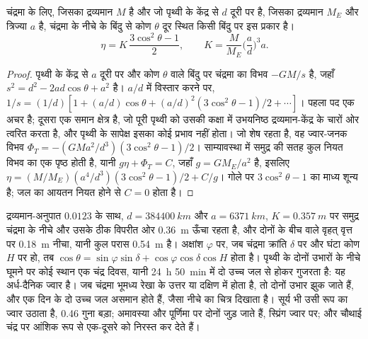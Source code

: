 \begin{theorem}[चंद्रमा का साम्य ज्वार]\label{thm:b3:ocean-dynamics:equilibrium-tide}
चंद्रमा के लिए, जिसका द्रव्यमान $M$ है और जो पृथ्वी के केंद्र से $d$ दूरी पर है,
जिसका द्रव्यमान $M_E$ और त्रिज्या $a$ है, चंद्रमा के नीचे के बिंदु से कोण $\theta$ दूर
स्थित किसी बिंदु पर  इस प्रकार है।
\[
\eta = K\,\frac{3\cos^2\theta - 1}{2},\qquad
K = \frac{M}{M_E}\Big(\frac{a}{d}\Big)^3 a .
\]
\end{theorem}

\begin{proof}
पृथ्वी के केंद्र से $a$ दूरी पर और कोण $\theta$ वाले बिंदु पर चंद्रमा का विभव
$-GM/s$ है, जहाँ $s^2 = d^2 - 2ad\cos\theta +
a^2$ है। $a/d$ में विस्तार करने पर, $1/s = (1/d)[1 + (a/d)\cos\theta + (a/d)^2
(3\cos^2\theta - 1)/2 + \cdots]$। पहला पद एक अचर है; दूसरा
एक समान क्षेत्र है, जो पूरी पृथ्वी को उसकी कक्षा में उभयनिष्ठ द्रव्यमान-केंद्र के
चारों ओर त्वरित करता है, और पृथ्वी के सापेक्ष इसका कोई प्रभाव नहीं होता।
जो शेष रहता है, वह ज्वार-जनक विभव $\Phi_T = -(GMa^2/d^3)(3
\cos^2\theta - 1)/2$। साम्यावस्था में समुद्र की सतह कुल नियत विभव का एक पृष्ठ होती है,
यानी $g\eta + \Phi_T = C$, जहाँ $g = GM_E/a^2$ है, इसलिए
$\eta = (M/M_E)(a^4/d^3)(3\cos^2\theta - 1)/2 + C/g$। गोले पर
$3\cos^2\theta - 1$ का माध्य शून्य है; जल का आयतन नियत होने से
$C = 0$ होता है।
\end{proof}

द्रव्यमान-अनुपात $0.0123$ के साथ, $d = \qty{384400}{km}$ और $a =
\qty{6371}{km}$, $K = \qty{0.357}{m}$ पर समुद्र चंद्रमा के नीचे और उसके ठीक विपरीत ओर
\qty{0.36}{m} ऊँचा रहता है, और दोनों के बीच वाले वृहत् वृत्त पर \qty{0.18}{m} नीचा,
यानी कुल परास \qty{0.54}{m} है। अक्षांश $\varphi$ पर, जब चंद्रमा क्रांति $\delta$ पर और घंटा कोण $H$ पर हो,
तब $\cos\theta =
\sin\varphi\sin\delta + \cos\varphi\cos\delta\cos H$ होता है।
पृथ्वी के दोनों उभारों के नीचे घूमने पर कोई स्थान एक चंद्र दिवस, यानी
\qty{24}{h} \qty{50}{min} में दो उच्च जल से होकर गुजरता है: यह अर्ध-दैनिक ज्वार है। जब चंद्रमा
भूमध्य रेखा के उत्तर या दक्षिण में होता है, तो दोनों उभार झुक जाते हैं, और एक दिन के दो उच्च जल
असमान होते हैं, जैसा नीचे का चित्र दिखाता है। सूर्य भी उसी रूप का ज्वार उठाता है,
\num{0.46} गुना बड़ा; अमावस्या और पूर्णिमा पर दोनों जुड़ जाते हैं,
स्प्रिंग ज्वार पर; और चौथाई चंद्र पर आंशिक रूप से एक-दूसरे को निरस्त कर देते हैं।

